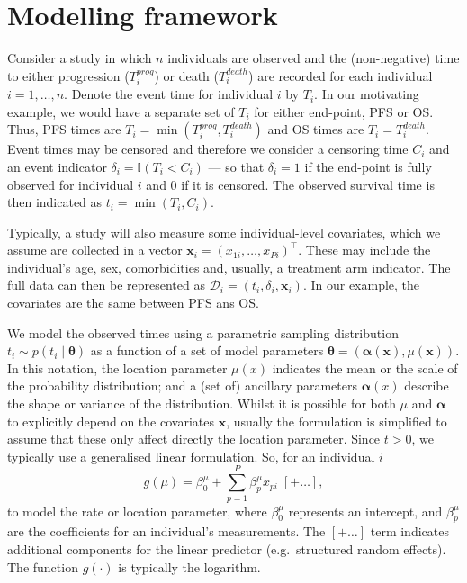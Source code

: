 \documentclass[AMA,STIX1COL]{WileyNJD-v2}
\begin{document}
%
\section{Modelling framework}\label{sec:methods}
Consider a study in which $n$ individuals are observed and the (non-negative) time to either progression ($T^{prog}_{i}$) or death ($T^{death}_{i}$) are recorded for each individual $i=1,\ldots,n$.
Denote the event time for individual $i$ by $T_{i}$.
In our motivating example, we would have a separate set of $T_{i}$ for either end-point, PFS or OS.
Thus, PFS times are $T_{i} = \min(T^{prog}_{i}, T^{death}_{i})$ and OS times are $T_{i} = T^{death}_{i}$.
Event times may be censored and therefore we consider a censoring time $C_{i}$ and an event indicator $\delta_{i} = \mathbb{I}(T_{i} < C_{i})$
--- so that $\delta_{i} = 1$ if the end-point is fully observed for individual $i$ and 0 if it is censored.
The observed survival time is then indicated as $t_{i} = \min(T_{i}, C_{i})$.

Typically, a study will also measure some individual-level covariates, which we assume are collected in a vector $\bm{x}_{i} = (x_{1i}, \ldots, x_{Pi})^\top$.
These may include the individual's age, sex, comorbidities and, usually, a treatment arm indicator.
The full data can then be represented as
$\mathcal{D}_i = (t_i, \delta_i, \bm{x}_i)$.
In our example, the covariates are the same between PFS ans OS.

We model the observed times using a parametric sampling distribution $t_{i} \sim p(t_{i} \mid \bm\theta)$ as a function of a set of model parameters $\bm\theta = (\bm\alpha(\bm x), \mu(\bm x))$. 
In this notation, the location parameter $\mu(x)$ indicates the mean or the scale of the probability distribution; and a (set of) ancillary parameters $\bm \alpha(x)$ describe the shape or variance of the distribution.
Whilst it is possible for both $\mu$ and $\bm\alpha$ to explicitly depend on the covariates $\bm x$, usually the formulation is simplified to assume that these only affect directly the location parameter.
Since $t>0$, we typically use a generalised linear formulation.
So, for an individual $i$
$$
g(\mu) = \beta^{\mu}_{0} + \sum_{p=1}^P \beta^{\mu}_{p} x_{pi} \; [+ \ldots ],
$$
to model the rate or location parameter,
where $\beta^{\mu}_{0}$ represents an intercept,
and $\beta^{\mu}_{p}$ are the coefficients for an individual's measurements.
The $[+ \ldots]$ term indicates additional components for the linear predictor (e.g.~structured random effects).
The function $g(\cdot)$ is typically the logarithm.
\end{document}
